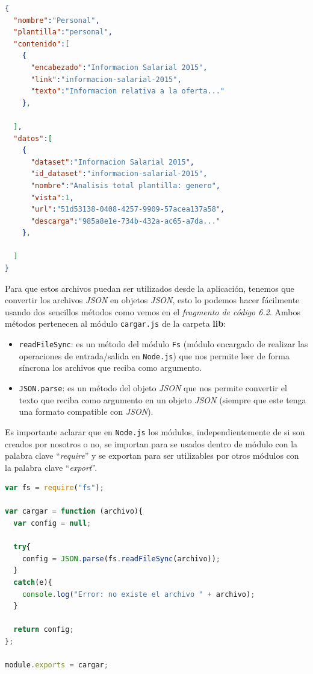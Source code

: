 \newpage
\begin{lstlisting}[language=json,caption={Archivo JSON con informacion de personal},label={lst:json_personal}]
{
  "nombre":"Personal",
  "plantilla":"personal",
  "contenido":[
    {
      "encabezado":"Informacion Salarial 2015",
      "link":"informacion-salarial-2015",
      "texto":"Informacion relativa a la oferta..."
    },
    
  ],
  "datos":[
    {
      "dataset":"Informacion Salarial 2015",
      "id_dataset":"informacion-salarial-2015",
      "nombre":"Analisis total plantilla: genero",
      "vista":1,
      "url":"51d53138-0408-4257-9909-57acea137a58",
      "descarga":"985a8e1e-734b-432a-ac65-a7da..."
    },
        
  ]
}
\end{lstlisting}

Para que estos archivos puedan ser utilizados desde la aplicación, tenemos que convertir los archivos \textit{JSON} en objetos \textit{JSON}, esto lo podemos hacer fácilmente usando dos sencillos métodos como vemos en el \textit{fragmento de código 6.2}. Ambos métodos pertenecen al módulo {\tt cargar.js} de la carpeta \textbf{lib}:

\begin{itemize}
	\item {\tt readFileSync}: es un método del módulo {\tt Fs} (módulo encargado de realizar las operaciones de entrada/salida en {\tt Node.js}) que nos permite leer de forma síncrona los archivos que reciba como argumento.
	\item {\tt JSON.parse}: es un método del objeto \textit{JSON} que nos permite convertir el texto que reciba como argumento en un objeto \textit{JSON} (siempre que este tenga una formato compatible con \textit{JSON}).
\end{itemize}

Es importante aclarar que en {\tt Node.js} los módulos, independientemente de si son creados por nosotros o no, se importan para se usados dentro de módulo con la palabra clave ``\textit{require}'' y se exportan para ser utilizables por otros módulos con la palabra clave ``\textit{export}''.

\newpage
\begin{lstlisting}[language=javascript,caption={Archivo cargar.js},label={lst:cargarjs}]
var fs = require("fs");
 
var cargar = function (archivo){
  var config = null;

  try{
    config = JSON.parse(fs.readFileSync(archivo));
  }
  catch(e){
    console.log("Error: no existe el archivo " + archivo);
  }

  return config;
};

module.exports = cargar;
\end{lstlisting}

